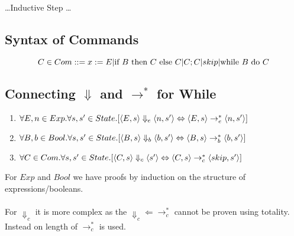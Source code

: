 \documentclass{report}
\begin{document}
                \dots Inductive Step \dots
        
        \subsection*{Syntax of Commands}
            \[C \in Com ::= x := E | \text{if } B \text{ then } C \text{ else } C | C;C | skip | \text{while } B \text{ do } C\]
            \begin{itemize}
            \end{itemize}
        \subsection*{Connecting $\Downarrow$ and $\to^*$ for While}
            
            \begin{enumerate}
                \item $\forall E, n \in Exp. \forall s, s' \in State . [\langle E, s \rangle \Downarrow_e \langle n, s' \rangle \Leftrightarrow \langle E, s \rangle \to_e^* \langle n, s' \rangle]$
                \item $\forall B, b \in Bool. \forall s, s' \in State . [\langle B, s \rangle \Downarrow_b \langle b, s' \rangle \Leftrightarrow \langle B, s \rangle \to_b^* \langle b, s' \rangle]$
                \item $\forall C \in Com. \forall s, s' \in State . [\langle C, s \rangle \Downarrow_c \langle s' \rangle \Leftrightarrow \langle C, s \rangle \to_c^* \langle skip, s' \rangle]$
            \end{enumerate}
            For $Exp$ and $Bool$ we have proofs by induction on the structure of expressions/booleans.
            \\
            \\ For $\Downarrow_c$ it is more complex as the $\Downarrow_c \Leftarrow \to_c^*$ cannot be proven using totality. Instead  on length of $\to_c^*$ is used.
                
\end{document}
